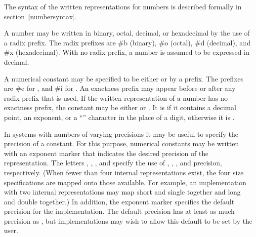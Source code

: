 
%

The syntax of the written representations for numbers is described formally in
section~\ref{numbersyntax}.

A number may be written in binary, octal, decimal, or
hexadecimal by the use of a radix prefix.  The radix prefixes are {\cf
\#b} (binary), {\cf \#o} (octal), {\cf
\#d} (decimal), and {\cf \#x} (hexadecimal).  With
no radix prefix, a number is assumed to be expressed in decimal.

A
numerical constant may be specified to be either  or
 by a prefix.  The prefixes are {\cf \#e}
for , and {\cf \#i} for .  An exactness
prefix may appear before or after any radix prefix that is used.  If
the written representation of a number has no exactness prefix, the
constant may be either  or .  It is
 if it contains a decimal point, an
exponent, or a ``\sharpsign'' character in the place of a digit,
otherwise it is .
%

In systems with  numbers
of varying precisions it may be useful to specify
the precision of a constant.  For this purpose, numerical constants
may be written with an exponent marker that indicates the
desired precision of the 
representation.  The letters , ,
, and  specify the use of , ,
, and  precision, respectively.  (When fewer
than four internal
representations exist, the four size
specifications are mapped onto those available.  For example, an
implementation with two internal representations may map short and
single together and long and double together.)  In addition, the
exponent marker  specifies the default precision for the
implementation.  The default precision has at least as much precision
as , but
implementations may wish to allow this default to be set by the user.

